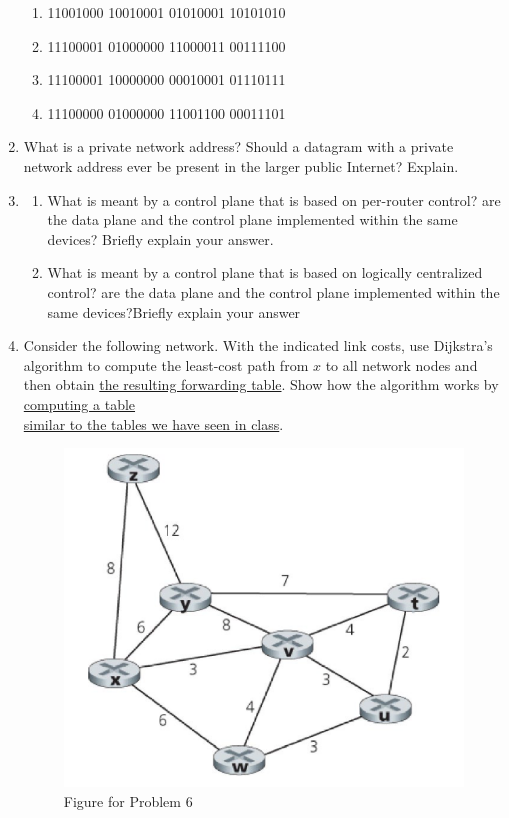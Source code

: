 \begin{enumerate}
    \begin{enumerate}

      \item 11001000 10010001 01010001 10101010 

      \item 11100001 01000000 11000011 00111100 

      \item 11100001 10000000 00010001 01110111

      \item 11100000 01000000 11001100 00011101

    \end{enumerate}

  \item What is a private network address? Should a datagram with a private network address ever be present in the larger public Internet? Explain.

  \item

    \begin{enumerate}

      \item What is meant by a control plane that is based on per-router control? are the data plane and the control plane implemented within the same devices? Briefly explain your answer.

      \item What is meant by a control plane that is based on logically centralized control? are the data plane and the control plane implemented within the same devices?Briefly explain your answer
        
    \end{enumerate}

  \item Consider the following network. With the indicated link costs, use Dijkstra’s algorithm to compute the least-cost path from $x$ to all network nodes and then obtain \underline{the resulting forwarding table}. Show how the algorithm works by \underline{computing a table }\\\underline{similar to the tables we have seen in class}.

    \begin{figure}[h]
      \centering
      \includegraphics[width=.6\textwidth]{Figures/Djikstra.png}
      \caption{Figure for Problem 6}
      \label{fig:1}
    \end{figure}

\end{enumerate}



